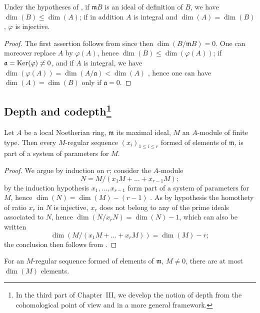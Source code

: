 \begin{corollary}[16.3.10]
\label{0.16.3.10}
Under the hypotheses of , if $\mathfrak{m}B$ is an ideal of definition of $B$, we have $\dim(B)\leq\dim(A)$; if in addition $A$ is integral and $\dim(A)=\dim(B)$, $\varphi$ is injective.
\end{corollary}

\begin{proof}
The first assertion follows from  since then $\dim(B/\mathfrak{m}B)=0$.
One can moreover replace $A$ by $\varphi(A)$, hence $\dim(B)\leq\dim(\varphi(A))$; if $\mathfrak{a}=\operatorname{Ker}(\varphi)\neq 0$, and if $A$ is integral, we have $\dim(\varphi(A))=\dim(A/\mathfrak{a})<\dim(A)$ , hence one can have $\dim(A)=\dim(B)$ only if $\mathfrak{a}=0$.
\end{proof}

\subsection[Depth and codepth]{Depth and
codepth\protect\footnote{In the third part of Chapter~III, we develop the
notion of depth from the cohomological point of view and in a more general
framework.}}
\label{subsection:0.16.4}

\begin{proposition}[16.4.1]
\label{0.16.4.1}
Let $A$ be a local Noetherian ring, $\mathfrak{m}$ its maximal ideal, $M$ an $A$-module of finite type.
Then every $M$-regular sequence $(x_i)_{1\leq i\leq r}$  formed of elements of $\mathfrak{m}$, is part of a system of parameters for $M$.
\end{proposition}

\begin{proof}
We argue by induction on $r$; consider the $A$-module
\[
  N=M/(x_1M+\ldots+x_{r-1}M);
\]
by the induction hypothesis $x_1,\ldots,x_{r-1}$ form part of a system of parameters for $M$, hence $\dim(N)=\dim(M)-(r-1)$ .
As by hypothesis the homothety of ratio $x_r$ in $N$ is injective, $x_r$ does not belong to any of the prime ideals associated to $N$, hence  $\dim(N/x_r N)=\dim(N)-1$, which can also be written
\[
  \dim(M/(x_1M+\ldots+x_r M))=\dim(M)-r;
\]
the conclusion then follows from .
\end{proof}

For an $M$-regular sequence formed of elements of $\mathfrak{m}$, $M\neq 0$, there are at most $\dim(M)$ elements.

